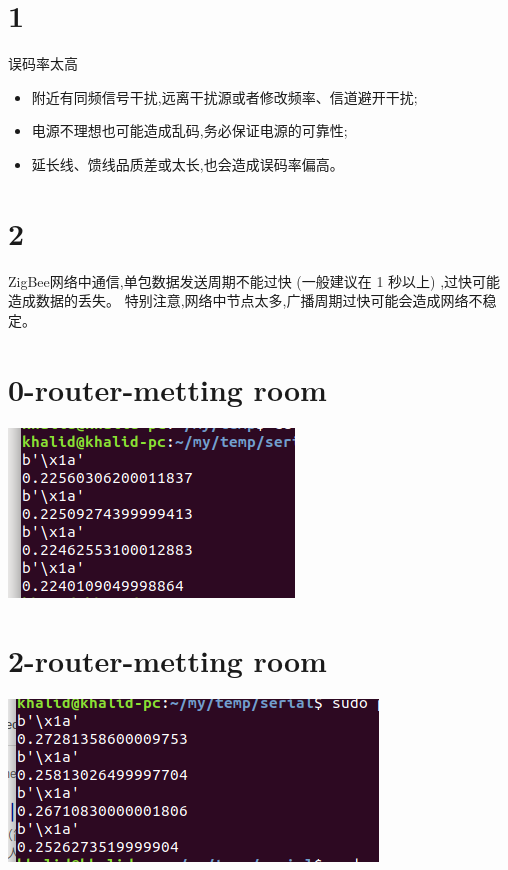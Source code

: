 \documentclass[12pt]{article}
\begin{document}
\begin{CJK}{UTF8}{gbsn}
\section{1}
误码率太高
\begin{itemize}
  \item 附近有同频信号干扰,远离干扰源或者修改频率、信道避开干扰;
  \item 电源不理想也可能造成乱码,务必保证电源的可靠性;
  \item 延长线、馈线品质差或太长,也会造成误码率偏高。
\end{itemize}
\section{2}
ZigBee网络中通信,单包数据发送周期不能过快 (一般建议在 1 秒以上) ,过快可能造成数据的丢失。
特别注意,网络中节点太多,广播周期过快可能会造成网络不稳定。 

\section{0-router-metting room}
  \includegraphics[width=\textwidth]{./0-router-metting-room.png}
\section{2-router-metting room}
  \includegraphics[width=\textwidth]{./2-router-metting-room.png}


\end{CJK}
\end{document}
